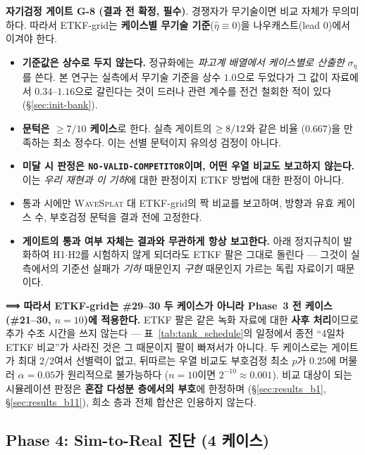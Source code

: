 \documentclass[11pt]{report}
\numberwithin{equation}{chapter}
\numberwithin{figure}{chapter}
\numberwithin{table}{chapter}
\newcommand{\WS}{\textsc{WaveSplat}}
\begin{document}
\textbf{자기검정 게이트 G-8 (결과 전 확정, 필수)}.
경쟁자가 무기술이면 비교 자체가 무의미하다. 따라서 ETKF-grid는
\textbf{케이스별 무기술 기준}($\hat{\eta} \equiv 0$)을 나우캐스트(lead 0)에서 이겨야 한다.
\begin{itemize}
  \item \textbf{기준값은 상수로 두지 않는다.} 정규화에는 \emph{파고계 배열에서 케이스별로
        산출한} $\sigma_\eta$를 쓴다. 본 연구는 실측에서 무기술 기준을 상수 $1.0$으로
        두었다가 그 값이 자료에서 $0.34$--$1.16$으로 갈린다는 것이 드러나
        관련 계수를 전건 철회한 적이 있다(\S\ref{sec:init-bank}).
  \item \textbf{문턱은 $\ge 7/10$ 케이스}로 한다. 실측 게이트의 $\ge 8/12$와 같은 비율
        ($0.667$)을 만족하는 최소 정수다. 이는 선별 문턱이지 유의성 검정이 아니다.
  \item \textbf{미달 시 판정은 \texttt{NO-VALID-COMPETITOR}이며, 어떤 우열 비교도 보고하지
        않는다.} 이는 \emph{우리 재현과 이 기하}에 대한 판정이지 ETKF 방법에 대한 판정이
        아니다.
  \item 통과 시에만 \WS{} 대 ETKF-grid의 짝 비교를 보고하며, 방향과 유효 케이스 수,
        부호검정 문턱을 결과 전에 고정한다.
  \item \textbf{게이트의 통과 여부 자체는 결과와 무관하게 항상 보고한다.} 아래 정지규칙이
        발화하여 H1$\cdot$H2를 시험하지 않게 되더라도 ETKF 팔은 그대로 돌린다 ---
        그것이 실측에서의 기준선 실패가 \emph{기하} 때문인지 \emph{구현} 때문인지 가르는
        독립 자료이기 때문이다.
\end{itemize}

\textbf{⟹ 따라서 ETKF-grid는 \#29--30 두 케이스가 아니라 Phase~3 전 케이스(\#21--30,
$n = 10$)에 적용한다.} ETKF 팔은 같은 녹화 자료에 대한 \textbf{사후 처리}이므로
추가 수조 시간을 쓰지 않는다 --- 표~\ref{tab:tank_schedule}의 일정에서 종전
``4일차 ETKF 비교''가 사라진 것은 그 때문이지 팔이 빠져서가 아니다. 두 케이스로는 게이트가 최대 $2/2$여서 선별력이 없고, 뒤따르는
우열 비교도 부호검정 최소 $p$가 $0.25$에 머물러 $\alpha = 0.05$가 원리적으로 불가능하다
($n = 10$이면 $2^{-10} \approx 0.001$).
비교 대상이 되는 시뮬레이션 판정은 \textbf{혼잡 다성분 층에서의 부호}에 한정하며
(\S\ref{sec:results_b1}, \S\ref{sec:results_b11}), 희소 층과 전체 합산은 인용하지 않는다.

\subsection{Phase 4: Sim-to-Real 진단 (4 케이스)}
\label{sec:tank_phase4}
\end{document}
